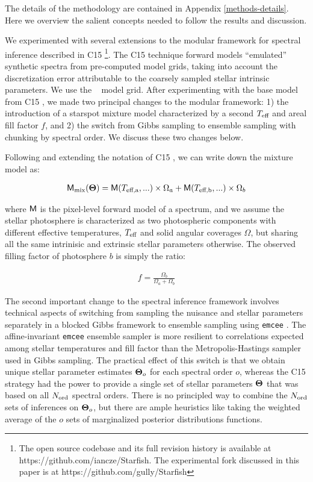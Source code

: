 \documentclass[onecolumn]{emulateapj}%
\newcommand{\iancze}{{\sc C15 }}
\begin{document}
The details of the methodology are contained in Appendix \ref{methods-details}.  Here we overview the salient concepts needed to follow the results and discussion.

We experimented with several extensions to the modular framework for spectral inference described in \iancze \footnote{The open source codebase and its full revision history is available at https://github.com/iancze/Starfish.  The experimental fork discussed in this paper is at https://github.com/gully/Starfish}.  The \iancze technique forward models ``emulated'' synthetic spectra from pre-computed model grids, taking into account the discretization error attributable to the coarsely sampled stellar intrinsic parameters.  We use the \PHOENIX~ model grid. After experimenting with the base model from \iancze, we made two principal changes to the modular framework: 1) the introduction of a starspot mixture model characterized by a second $T_\textrm{eff}$ and areal fill factor $f$, and 2) the switch from Gibbs sampling to ensemble sampling with chunking by spectral order.  We discuss these two changes below.

Following and extending the notation of \iancze, we can write down the mixture model as:

\begin{eqnarray} \label{eqn:mix_M}
\mathsf{M}_{\mathrm{mix}}({\bm \Theta}) = \mathsf{M}(T_\textrm{eff,a}, ...) \times \Omega_a + \mathsf{M}(T_\textrm{eff,b}, ...) \times \Omega_b
\end{eqnarray}

where $\mathsf{M}$ is the pixel-level forward model of a spectrum, and we assume the stellar photosphere is characterized as two photospheric components with different effective temperatures, $T_\textrm{eff}$ and solid angular coverages $\Omega$, but sharing all the same intrinisic and extrinsic stellar parameters otherwise.  The observed filling factor of photosphere $b$ is simply the ratio:

\begin{eqnarray} \label{eqn:fill_factor}
f = \frac{\Omega_b}{\Omega_a + \Omega_b}
\end{eqnarray}

The second important change to the spectral inference framework involves technical aspects of switching from sampling the nuisance and stellar parameters separately in a blocked Gibbs framework to ensemble sampling using \texttt{emcee} \cite{2013PASP..125..306F}.  The affine-invariant \texttt{emcee} ensemble sampler is more resilient to correlations expected among stellar temperatures and fill factor than the Metropolis-Hastings sampler used in Gibbs sampling.  The practical effect of this switch is that we obtain unique stellar parameter estimates ${\bm \Theta}_{o}$ for each spectral order $o$, whereas the \iancze strategy had the power to provide a single set of stellar parameters ${\bm \Theta}$ that was based on all $N_{\rm ord}$ spectral orders.  There is no principled way to combine the $N_{\rm ord}$ sets of inferences on ${\bm \Theta}_{o}$, but there are ample heuristics like taking the weighted average of the $o$ sets of marginalized posterior distributions functions.
\end{document}
